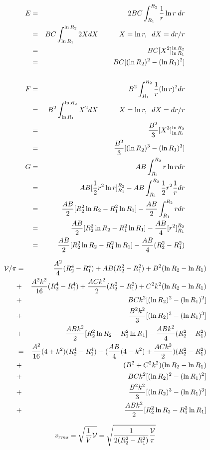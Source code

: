\begin{itemize}
\begin{eqnarray}
E
&=&2BC \int_{R_1}^{R_2} \frac{1}{r} \ln r \; dr  \nonumber\\
&=& BC \int_{\ln R_1}^{\ln R_2} 2X dX  \quad\quad\quad X=\ln r,\;\; dX=dr/r\nonumber\\  
&=& BC [ X^2 ]_{\ln R_1}^{\ln R_2} \nonumber\\
&=& BC [ (\ln R_2)^2-(\ln R_1)^2]
\nonumber\\
\nonumber\\
F &=&
B^2 \int_{R_1}^{R_2}  \frac{1}{r} (\ln r )^2 dr  \nonumber\\
&=& B^2 \int_{\ln R_1}^{\ln R_2}  X^2 dX  \quad\quad\quad X=\ln r,\;\; dX=dr/r\nonumber\\  
&=& \frac{B^2}{3} [ X^3]_{\ln R_1}^{\ln R_2} \nonumber\\
&=& \frac{B^2}{3} [ (\ln R_2)^3-(\ln R_1)^3] \nonumber\\
G
&=& AB \int_{R_1}^{R_2}  r \ln r dr  \nonumber\\
&=& AB [ \frac{1}{2}r^2 \ln r  ]_{R_1}^{R_2} - AB \int_{R_1}^{R_2} \frac{1}{2}r^2 \frac{1}{r} dr \nonumber\\
&=& \frac{AB}{2} [ R_2^2 \ln R_2 - R_1^2 \ln R_1] - \frac{AB}{2} \int_{R_1}^{R_2} r dr \nonumber\\
&=& \frac{AB}{2} [ R_2^2 \ln R_2 - R_1^2 \ln R_1] - \frac{AB}{4} [r^2]_{R_1}^{R_2}  \nonumber\\
&=& \frac{AB}{2} [ R_2^2 \ln R_2 - R_1^2 \ln R_1] - \frac{AB}{4} (R_2^2 - R_1^2) \nonumber 
\end{eqnarray}


\begin{eqnarray}
{\cal V}/\pi
&=&  \frac{A^2}{4}(R_2^4-R_1^4) + AB (R_2^2-R_1^2) + B^2 (\ln R_2 - \ln R_1) \nonumber\\
&+&  \frac{A^2k^2}{16} (R_2^4-R_1^4) + \frac{ACk^2}{2} (R_2^2-R_1^2) + C^2 k^2(\ln R_2 - \ln R_1 ) \nonumber\\
&+& BC k^2[ (\ln R_2)^2-(\ln R_1)^2] \nonumber\\
&+& \frac{B^2k^2}{3} [ (\ln R_2)^3-(\ln R_1)^3] \nonumber\\
&+& \frac{ABk^2}{2} [ R_2^2 \ln R_2 - R_1^2 \ln R_1] - \frac{ABk^2}{4} (R_2^2 - R_1^2) \nonumber\\
&=& \frac{A^2}{16}(4+k^2)(R_2^4-R_1^4) + (\frac{AB}{4}(4-k^2) +\frac{ACk^2}{2}) (R_2^2-R_1^2) \nonumber\\
&+&  (B^2+C^2 k^2) (\ln R_2 - \ln R_1) \nonumber\\
&+& BC k^2[ (\ln R_2)^2-(\ln R_1)^2] \nonumber\\
&+& \frac{B^2k^2}{3} [ (\ln R_2)^3-(\ln R_1)^3] \nonumber\\
&+& \frac{ABk^2}{2} [ R_2^2 \ln R_2 - R_1^2 \ln R_1] 
\end{eqnarray}

\[
v_{rms} =\sqrt{\frac{1}{V} {\cal V}} = \sqrt{ \frac{1}{2(R_2^2-R_1^2)} \frac{\cal V}{\pi}  }
\]
\end{itemize}



